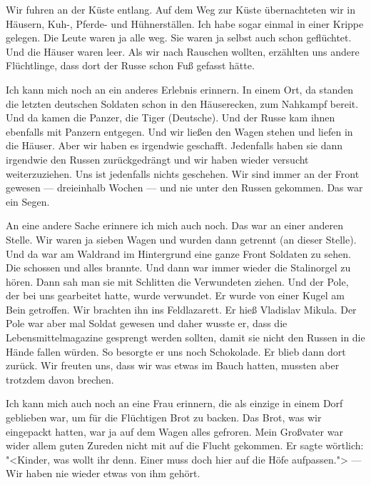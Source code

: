 \documentclass[12pt, twoside]{book}
\begin{document}
Wir fuhren an der Küste entlang. Auf dem Weg zur Küste übernachteten wir in Häusern, Kuh-, Pferde- und Hühnerställen. Ich habe sogar einmal in einer Krippe gelegen. Die Leute waren ja alle weg.
Sie waren ja selbst auch schon geflüchtet. Und die Häuser waren leer.
Als wir nach Rauschen wollten, erzählten uns andere Flüchtlinge, dass dort der Russe schon Fuß gefasst hätte. 

Ich kann mich noch an ein anderes Erlebnis erinnern. In einem Ort, da standen die letzten deutschen Soldaten schon in den Häuserecken, zum Nahkampf bereit. Und da kamen die Panzer, die Tiger (Deutsche). Und der Russe
kam ihnen ebenfalls mit Panzern entgegen. Und wir ließen den Wagen stehen und liefen in die Häuser. Aber wir haben es irgendwie geschafft.
Jedenfalls haben sie dann irgendwie den Russen zurückgedrängt und wir haben wieder versucht weiterzuziehen. Uns ist jedenfalls nichts geschehen.
	Wir sind immer an der Front gewesen --- dreieinhalb Wochen --- und nie unter den Russen gekommen. Das war ein Segen.

An eine andere Sache erinnere ich mich auch noch. Das war an einer anderen Stelle. Wir waren ja sieben Wagen und wurden dann getrennt (an dieser Stelle). Und da war am Waldrand im Hintergrund eine ganze Front Soldaten zu sehen.
Die schossen und alles brannte. Und dann war immer wieder die Stalinorgel zu hören. Dann sah man sie mit Schlitten die Verwundeten ziehen.
Und der Pole, der bei uns gearbeitet hatte, wurde verwundet. Er wurde von einer Kugel am Bein getroffen. Wir brachten ihn ins Feldlazarett. Er hieß Vladislav Mikula. 
Der Pole war aber mal Soldat gewesen und daher wusste er, dass die Lebensmittelmagazine gesprengt werden sollten, damit sie nicht den Russen in die Hände fallen würden. So besorgte er uns noch Schokolade. Er blieb dann dort zurück.
Wir freuten uns, dass wir was etwas im Bauch hatten, mussten aber trotzdem davon brechen.

Ich kann mich auch noch an eine Frau erinnern, die als einzige in einem Dorf geblieben war, um für die Flüchtigen Brot zu backen. Das Brot, was wir eingepackt hatten, war ja auf dem Wagen alles gefroren.
Mein Großvater war wider allem guten Zureden nicht mit auf die Flucht gekommen. Er sagte wörtlich: "<Kinder, was wollt ihr denn. Einer muss doch hier auf die Höfe aufpassen."> --- Wir haben nie wieder etwas von ihm gehört.
\end{document}
